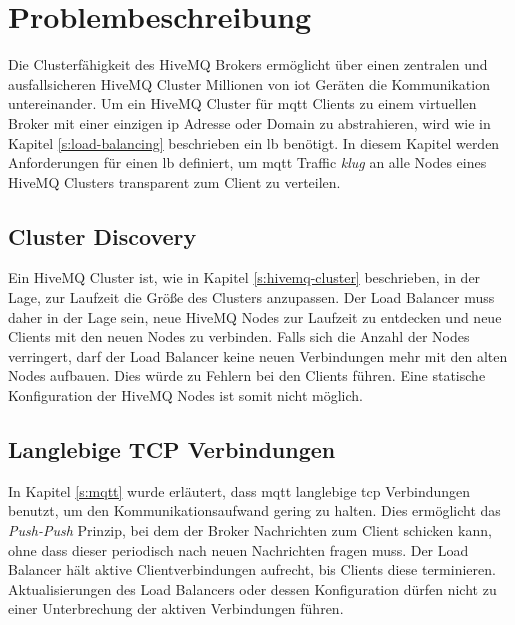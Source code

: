 \section{Problembeschreibung} \label{s:problem}
Die Clusterfähigkeit des HiveMQ Brokers ermöglicht über einen zentralen und ausfallsicheren HiveMQ Cluster Millionen von \ac{iot} Geräten die Kommunikation untereinander.
Um ein HiveMQ Cluster für \ac{mqtt} Clients zu einem virtuellen Broker mit einer einzigen \ac{ip} Adresse oder Domain zu abstrahieren, wird wie in Kapitel \ref{s:load-balancing} beschrieben ein \acl{lb} benötigt.
In diesem Kapitel werden Anforderungen für einen \acl{lb} definiert, um \ac{mqtt} Traffic \textit{klug} an alle Nodes eines HiveMQ Clusters transparent zum Client zu verteilen.

\subsection{Cluster Discovery} \label{sp:cluster-discovery}
Ein HiveMQ Cluster ist, wie in Kapitel \ref{s:hivemq-cluster} beschrieben, in der Lage, zur Laufzeit die Grö{\ss}e des Clusters anzupassen. Der Load Balancer muss daher in der Lage sein, neue HiveMQ Nodes zur Laufzeit zu entdecken und neue Clients mit den neuen Nodes zu verbinden. Falls sich die Anzahl der Nodes verringert, darf der Load Balancer keine neuen Verbindungen mehr mit den alten Nodes aufbauen. Dies würde zu Fehlern bei den Clients führen.
Eine statische Konfiguration der HiveMQ Nodes ist somit nicht möglich.

\subsection{Langlebige TCP Verbindungen}
In Kapitel \ref{s:mqtt} wurde erläutert, dass \ac{mqtt} langlebige \ac{tcp} Verbindungen benutzt, um den Kommunikationsaufwand gering zu halten.
Dies ermöglicht das \textit{Push-Push} Prinzip, bei dem der Broker Nachrichten zum Client schicken kann, ohne dass dieser periodisch nach neuen Nachrichten fragen muss.
Der Load Balancer hält aktive Clientverbindungen aufrecht, bis Clients diese terminieren.
Aktualisierungen des Load Balancers oder dessen Konfiguration dürfen nicht zu einer Unterbrechung der aktiven Verbindungen führen.

